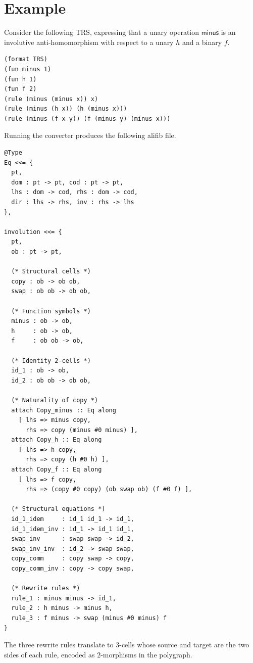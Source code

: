 \documentclass[acmsmall,screen,nonacm]{acmart}
\newcommand{\alifib}{\textsf{alifib}}
\begin{document}
\section{Example}
\label{sec:example}

Consider the following TRS, expressing that a unary operation
$\mathsf{minus}$ is an involutive anti-homomorphism with respect to a
unary $h$ and a binary $f$.

\begin{lstlisting}[style=ari,title={Input: \texttt{involution.ari}}]
(format TRS)
(fun minus 1)
(fun h 1)
(fun f 2)
(rule (minus (minus x)) x)
(rule (minus (h x)) (h (minus x)))
(rule (minus (f x y)) (f (minus y) (minus x)))
\end{lstlisting}

\noindent Running the converter produces the following \alifib{} file.

\begin{lstlisting}[style=ali,title={Output: \texttt{involution.ali}}]
@Type
Eq <<= {
  pt,
  dom : pt -> pt, cod : pt -> pt,
  lhs : dom -> cod, rhs : dom -> cod,
  dir : lhs -> rhs, inv : rhs -> lhs
},

involution <<= {
  pt,
  ob : pt -> pt,

  (* Structural cells *)
  copy : ob -> ob ob,
  swap : ob ob -> ob ob,

  (* Function symbols *)
  minus : ob -> ob,
  h     : ob -> ob,
  f     : ob ob -> ob,

  (* Identity 2-cells *)
  id_1 : ob -> ob,
  id_2 : ob ob -> ob ob,

  (* Naturality of copy *)
  attach Copy_minus :: Eq along
    [ lhs => minus copy,
      rhs => copy (minus #0 minus) ],
  attach Copy_h :: Eq along
    [ lhs => h copy,
      rhs => copy (h #0 h) ],
  attach Copy_f :: Eq along
    [ lhs => f copy,
      rhs => (copy #0 copy) (ob swap ob) (f #0 f) ],

  (* Structural equations *)
  id_1_idem     : id_1 id_1 -> id_1,
  id_1_idem_inv : id_1 -> id_1 id_1,
  swap_inv      : swap swap -> id_2,
  swap_inv_inv  : id_2 -> swap swap,
  copy_comm     : copy swap -> copy,
  copy_comm_inv : copy -> copy swap,

  (* Rewrite rules *)
  rule_1 : minus minus -> id_1,
  rule_2 : h minus -> minus h,
  rule_3 : f minus -> swap (minus #0 minus) f
}
\end{lstlisting}

\noindent The three rewrite rules translate to $3$-cells whose
source and target are the two sides of each rule, encoded as
$2$-morphisms in the polygraph.
\end{document}
